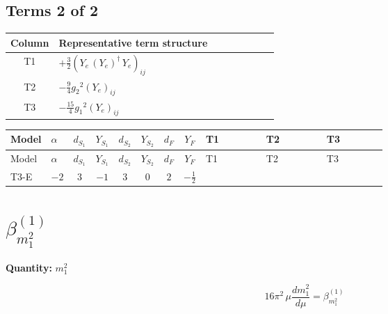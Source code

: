 \documentclass[8pt]{article}
\begin{document}
\begin{landscape}
\subsection*{Terms 2 of 2}
\begin{center}
\begin{tabular}{@{}c >{\raggedright\arraybackslash}p{0.82\linewidth}@{}}
\toprule
Column & Representative term structure \\
\midrule
T1 & \(\displaystyle +\frac{3}{2} \left({Y_e}\,\left({Y_e}\right)^{\dagger}\,{Y_e}\right)_{ij}\) \\
\midrule
T2 & \(\displaystyle -\frac{9}{4} {g_2}^2 \left({Y_e}\right)_{ij}\) \\
\midrule
T3 & \(\displaystyle -\frac{15}{4} {g_1}^2 \left({Y_e}\right)_{ij}\) \\
\midrule
\bottomrule
\end{tabular}
\end{center}
\smallskip
\tiny
\begin{longtable}{@{}llcccccc >{\raggedright\arraybackslash}p{0.21\linewidth} >{\raggedright\arraybackslash}p{0.21\linewidth} >{\raggedright\arraybackslash}p{0.21\linewidth}@{}}
\toprule
Model & $\alpha$ & $d_{S_1}$ & $Y_{S_1}$ & $d_{S_2}$ & $Y_{S_2}$ & $d_F$ & $Y_F$ & T1 & T2 & T3 \\
\midrule
\endfirsthead
\toprule
Model & $\alpha$ & $d_{S_1}$ & $Y_{S_1}$ & $d_{S_2}$ & $Y_{S_2}$ & $d_F$ & $Y_F$ & T1 & T2 & T3 \\
\midrule
\endhead
T3-E & $-2$ & $3$ & $-1$ & $3$ & $0$ & $2$ & $-\frac{1}{2}$ & \scriptsize\adjustbox{max width=\linewidth}{$\begin{gathered} +\frac{3}{2} \left({Y_e}\,\left({Y_e}\right)^{\dagger}\,{Y_e}\right)_{ij}\end{gathered}$} & \scriptsize\adjustbox{max width=\linewidth}{$\begin{gathered} -\frac{9}{4} {g_2}^2 \left({Y_e}\right)_{ij}\end{gathered}$} & \scriptsize\adjustbox{max width=\linewidth}{$\begin{gathered} -\frac{15}{4} {g_1}^2 \left({Y_e}\right)_{ij}\end{gathered}$} \\
\midrule
\bottomrule
\end{longtable}
\clearpage
\section*{$\beta_{m_1^2}^{(1)}$}
\noindent\textbf{Quantity: }$m_1^2$\par\smallskip
\[16\pi^2\,\mu\frac{d m_1^2}{d\mu}=\beta_{m_1^2}^{(1)}\]

\end{landscape}
\end{document}
